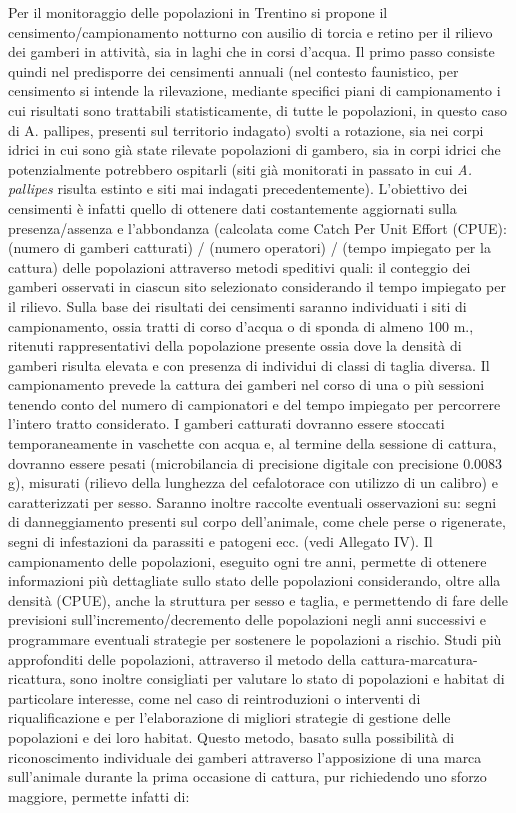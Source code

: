 \documentclass[11pt,a4paper,italian,twoside,openany]{memoir}
\begin{document}
Per il monitoraggio delle popolazioni in Trentino si propone il censimento/campionamento notturno con ausilio di torcia e retino per il rilievo dei gamberi in attività, sia in laghi che in corsi d'acqua. Il primo passo consiste quindi nel predisporre dei censimenti annuali (nel contesto faunistico, per censimento si intende la rilevazione, mediante specifici piani di campionamento i cui risultati sono trattabili statisticamente, di tutte le popolazioni, in questo caso di A. pallipes, presenti sul territorio indagato) svolti a rotazione, sia nei corpi idrici in cui sono già state rilevate popolazioni di gambero, sia in corpi idrici che potenzialmente potrebbero ospitarli (siti già monitorati in passato in cui \emph{A. pallipes} risulta estinto e siti mai indagati precedentemente). L'obiettivo dei censimenti è infatti quello di ottenere dati costantemente aggiornati sulla presenza/assenza e l'abbondanza (calcolata come Catch Per Unit Effort (CPUE): (numero di gamberi catturati) / (numero operatori) / (tempo impiegato per la cattura) delle popolazioni attraverso metodi speditivi quali: il conteggio dei gamberi osservati in ciascun sito selezionato considerando il tempo impiegato per il rilievo.  
Sulla base dei risultati dei censimenti saranno individuati i siti di campionamento, ossia tratti di corso d'acqua o di sponda di almeno 100 m., ritenuti rappresentativi della popolazione presente ossia dove la densità di gamberi risulta elevata e con presenza di individui di classi di taglia diversa. Il campionamento prevede la cattura dei gamberi nel corso di una o più sessioni tenendo conto del numero di campionatori e del tempo impiegato per percorrere l'intero tratto considerato. I gamberi catturati dovranno essere stoccati temporaneamente in vaschette con acqua e, al termine della sessione di cattura, dovranno essere pesati (microbilancia di precisione digitale con precisione 0.0083 g), misurati (rilievo della lunghezza del cefalotorace con utilizzo di un calibro) e caratterizzati per sesso. Saranno inoltre raccolte eventuali osservazioni su: segni di danneggiamento presenti sul corpo dell'animale, come chele perse o rigenerate, segni di infestazioni da parassiti e patogeni ecc. (vedi Allegato IV). Il campionamento delle popolazioni, eseguito ogni tre anni, permette di ottenere informazioni più dettagliate sullo stato delle popolazioni considerando, oltre alla densità (CPUE), anche la struttura per sesso e taglia, e permettendo di fare delle previsioni sull'incremento/decremento delle popolazioni negli anni successivi e programmare eventuali strategie per sostenere le popolazioni a rischio. Studi più approfonditi delle popolazioni, attraverso il metodo della cattura-marcatura-ricattura, sono inoltre consigliati per valutare lo stato di popolazioni e habitat di particolare interesse, come nel caso di reintroduzioni o interventi di riqualificazione e per l'elaborazione di migliori strategie di gestione delle popolazioni e dei loro habitat. Questo metodo, basato sulla possibilità di riconoscimento individuale dei gamberi attraverso l'apposizione di una marca sull'animale durante la prima occasione di cattura, pur richiedendo uno sforzo maggiore, permette infatti di:
\end{document}
